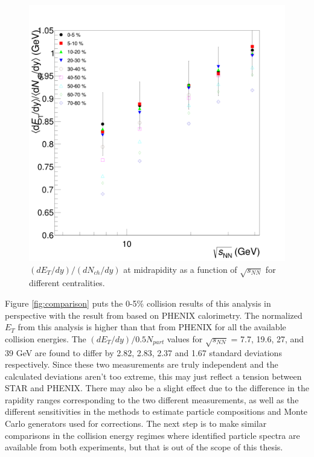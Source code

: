 	\begin{figure}[h]
	  \centering
	  \includegraphics[width=5.5in]{figures/finalStacked/dETdyOverdNchdySumCent8s.png}
	  \caption{$(dE_{T}/dy)/(dN_{ch}/dy)$ at midrapidity as a function of $\sqrt{s_{NN}}$ for different centralities.}\label{fig:dETdyOverdNchdySumCents}
	\end{figure}
	
Figure \ref{fig:comparison} puts the 0-5\% collision results of this analysis in perspective with the result from \cite{PhysRevC.93.024901} based on PHENIX calorimetry. The normalized $E_{T}$ from this analysis is higher than that from PHENIX for all the available collision energies. The $(dE_{T}/dy)/0.5N_{part}$ values for $\sqrt{s_{NN}}$ = 7.7, 19.6, 27, and 39 GeV are found to differ by 2.82, 2.83, 2.37 and 1.67 standard deviations respectively. Since these two measurements are truly independent and the calculated deviations aren't too extreme, this may just reflect a tension between STAR and PHENIX. There may also be a slight effect due to the difference in the rapidity ranges corresponding to the two different measurements, as well as the different sensitivities in the methods to estimate particle compositions and Monte Carlo generators used for corrections. The next step is to make similar comparisons in the collision energy regimes where identified particle spectra are available from both experiments, but that is out of the scope of this thesis.%

